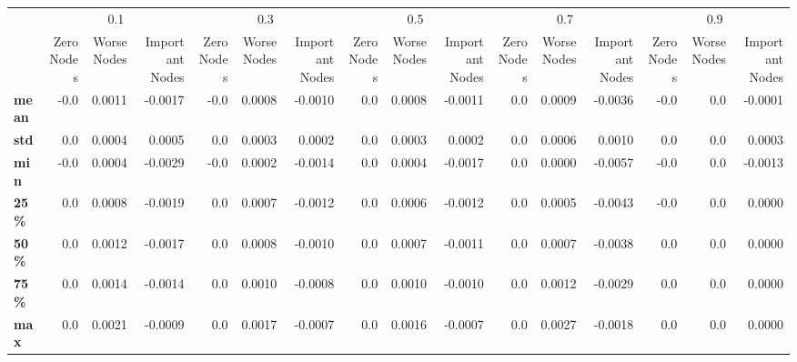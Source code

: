 \begin{tabular}{lrrrrrrrrrrrrrrr}
\toprule
{} & \multicolumn{3}{c}{0.1} & \multicolumn{3}{c}{0.3} & \multicolumn{3}{c}{0.5} & \multicolumn{3}{c}{0.7} & \multicolumn{3}{c}{0.9} \\
{} & Zero Nodes & Worse Nodes & Important Nodes & Zero Nodes & Worse Nodes & Important Nodes & Zero Nodes & Worse Nodes & Important Nodes & Zero Nodes & Worse Nodes & Important Nodes & Zero Nodes & Worse Nodes & Important Nodes \\
\midrule
\textbf{mean} &       -0.0 &      0.0011 &         -0.0017 &       -0.0 &      0.0008 &         -0.0010 &        0.0 &      0.0008 &         -0.0011 &        0.0 &      0.0009 &         -0.0036 &       -0.0 &         0.0 &         -0.0001 \\
\textbf{std } &        0.0 &      0.0004 &          0.0005 &        0.0 &      0.0003 &          0.0002 &        0.0 &      0.0003 &          0.0002 &        0.0 &      0.0006 &          0.0010 &        0.0 &         0.0 &          0.0003 \\
\textbf{min } &       -0.0 &      0.0004 &         -0.0029 &       -0.0 &      0.0002 &         -0.0014 &        0.0 &      0.0004 &         -0.0017 &        0.0 &      0.0000 &         -0.0057 &       -0.0 &         0.0 &         -0.0013 \\
\textbf{25\% } &        0.0 &      0.0008 &         -0.0019 &        0.0 &      0.0007 &         -0.0012 &        0.0 &      0.0006 &         -0.0012 &        0.0 &      0.0005 &         -0.0043 &       -0.0 &         0.0 &          0.0000 \\
\textbf{50\% } &        0.0 &      0.0012 &         -0.0017 &        0.0 &      0.0008 &         -0.0010 &        0.0 &      0.0007 &         -0.0011 &        0.0 &      0.0007 &         -0.0038 &        0.0 &         0.0 &          0.0000 \\
\textbf{75\% } &        0.0 &      0.0014 &         -0.0014 &        0.0 &      0.0010 &         -0.0008 &        0.0 &      0.0010 &         -0.0010 &        0.0 &      0.0012 &         -0.0029 &        0.0 &         0.0 &          0.0000 \\
\textbf{max } &        0.0 &      0.0021 &         -0.0009 &        0.0 &      0.0017 &         -0.0007 &        0.0 &      0.0016 &         -0.0007 &        0.0 &      0.0027 &         -0.0018 &        0.0 &         0.0 &          0.0000 \\
\bottomrule
\end{tabular}

